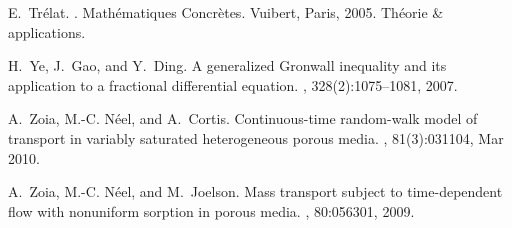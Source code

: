 \documentclass[english,11pt,reqno]{smfart}
\begin{document}
\begin{thebibliography}{10}
E.~Tr{\'e}lat.
.
\newblock Math\'ematiques Concr\`etes. Vuibert, Paris, 2005.
\newblock Th{\'e}orie \& applications.

H.~Ye, J.~Gao, and Y.~Ding.
\newblock A generalized {G}ronwall inequality and its application to a
  fractional differential equation.
, 328(2):1075--1081, 2007.

A.~Zoia, M.-C. N\'eel, and A.~Cortis.
\newblock Continuous-time random-walk model of transport in variably saturated
  heterogeneous porous media.
, 81(3):031104, Mar 2010.

A.~Zoia, M.-C. N\'eel, and M.~Joelson.
\newblock Mass transport subject to time-dependent flow with nonuniform
  sorption in porous media.
, 80:056301, 2009.

\end{thebibliography}
\end{document}
